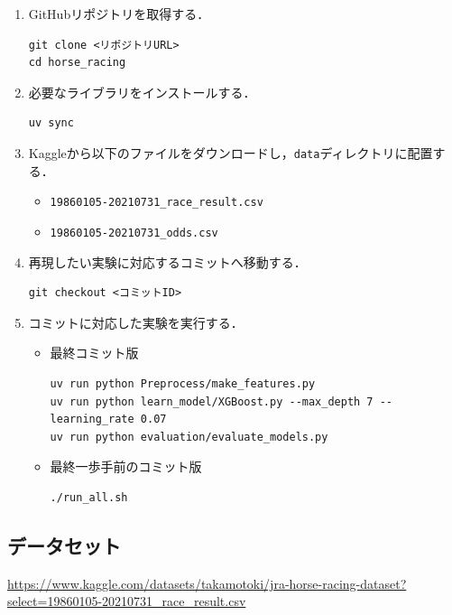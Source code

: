 \documentclass[dvipdfmx, a4paper, 11pt, titlepage]{jsarticle}
\begin{document}
\begin{enumerate}
    \item GitHubリポジトリを取得する．

\begin{verbatim}
git clone <リポジトリURL>
cd horse_racing
\end{verbatim}

    \item 必要なライブラリをインストールする．

\begin{verbatim}
uv sync
\end{verbatim}

    \item Kaggleから以下のファイルをダウンロードし，\texttt{data}ディレクトリに配置する．

    \begin{itemize}
        \item \texttt{19860105-20210731\_race\_result.csv}
        \item \texttt{19860105-20210731\_odds.csv}
    \end{itemize}

    \item 再現したい実験に対応するコミットへ移動する．

\begin{verbatim}
git checkout <コミットID>
\end{verbatim}

    \item コミットに対応した実験を実行する．

    \begin{itemize}
        \item 最終コミット版

\begin{verbatim}
uv run python Preprocess/make_features.py
uv run python learn_model/XGBoost.py --max_depth 7 --learning_rate 0.07
uv run python evaluation/evaluate_models.py
\end{verbatim}

        \item 最終一歩手前のコミット版

\begin{verbatim}
./run_all.sh
\end{verbatim}

    \end{itemize}

\end{enumerate}

\subsection{データセット}
\url{https://www.kaggle.com/datasets/takamotoki/jra-horse-racing-dataset?select=19860105-20210731_race_result.csv}
\end{document}
